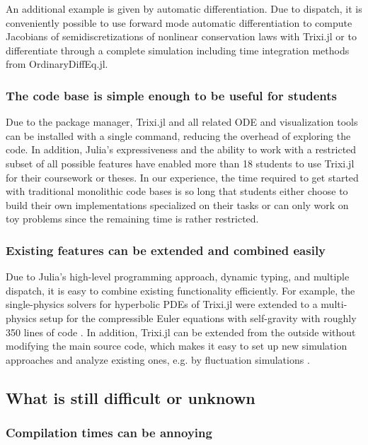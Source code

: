 \documentclass{juliacon}
\makeatletter
\newcommand{\eg}[0]{{e.g.\@}\xspace}
\newcommand{\trixi}{Trixi.jl\xspace}
\makeatother
\begin{document}
An additional example is given by automatic differentiation. Due to dispatch,
it is conveniently possible to use forward mode automatic differentiation
\cite{revels2016forward} to compute Jacobians of semidiscretizations of nonlinear
conservation laws with \trixi or to differentiate through a complete simulation
including time integration methods from OrdinaryDiffEq.jl.

\subsubsection{The code base is simple enough to be useful for students}

Due to the package manager, \trixi and all related ODE and visualization tools
can be installed with a single command, reducing the overhead of exploring the
code. In addition, Julia's expressiveness and the ability to work with a restricted
subset of all possible features have enabled more than 18 students to use \trixi
for their coursework or theses. In our experience, the time required to get
started with traditional monolithic code bases is so long that students either
choose to build their own implementations specialized on their tasks or can only
work on toy problems since the remaining time is rather restricted.

\subsubsection{Existing features can be extended and combined easily}

Due to Julia's high-level programming approach, dynamic typing, and multiple
dispatch, it is easy to combine existing functionality efficiently. For example,
the single-physics solvers for hyperbolic PDEs of \trixi were extended to
a multi-physics setup for the compressible Euler equations with self-gravity
with roughly 350 lines of code \cite{schlottkelakemper2021purely}.
In addition, \trixi can be extended from the outside without modifying the main
source code, which makes it easy to set up new simulation approaches and analyze
existing ones, \eg by fluctuation simulations \cite{ranocha2021preventing}.


\subsection{What is still difficult or unknown}

\subsubsection{Compilation times can be annoying}
\end{document}
